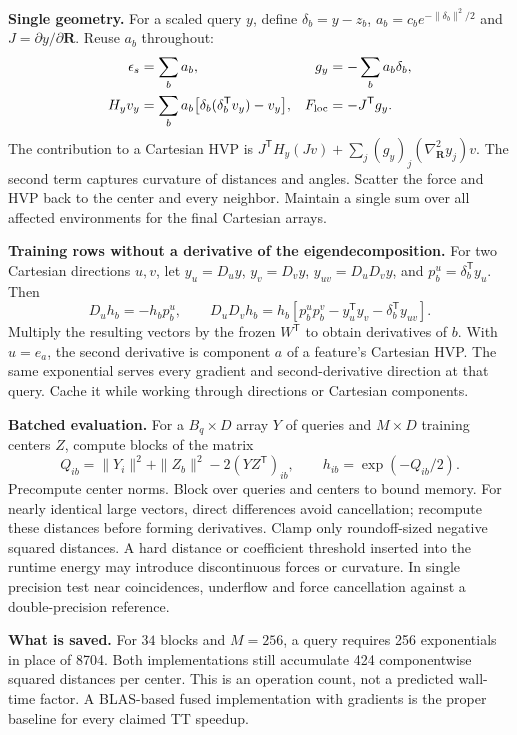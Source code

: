 \documentclass[11pt,a4paper]{article}
\newcommand{\T}{\mathsf T}\newcommand{\tr}{\operatorname{tr}}
\begin{document}
\textbf{Single geometry.} For a scaled query $y$, define $\delta_b=y-z_b$, $a_b=c_b e^{-\|\delta_b\|^2/2}$ and $J=\partial y/\partial\mathbf R$. Reuse $a_b$ throughout:
\begin{align}
 \epsilon_s&=\sum_b a_b,& g_y&=-\sum_b a_b\delta_b,\\
 H_y v_y&=\sum_b a_b\big[\delta_b(\delta_b^\T v_y)-v_y\big],&
 F_{\rm loc}&=-J^\T g_y . \label{eq:fusedh}
\end{align}
The contribution to a Cartesian HVP is $J^\T H_y(Jv)+\sum_j(g_y)_j(\nabla^2_{\mathbf R}y_j)v$. The second term captures curvature of distances and angles. Scatter the force and HVP back to the center and every neighbor. Maintain a single sum over all affected environments for the final Cartesian arrays.

\textbf{Training rows without a derivative of the eigendecomposition.} For two Cartesian directions $u,v$, let $y_u=D_u y$, $y_v=D_v y$, $y_{uv}=D_uD_v y$, and $p_b^u=\delta_b^\T y_u$. Then
\begin{equation}
 D_u h_b=-h_b p_b^u,\qquad
 D_uD_v h_b=h_b[p_b^u p_b^v-y_u^\T y_v-\delta_b^\T y_{uv}]. \label{eq:fusejet}
\end{equation}
Multiply the resulting vectors by the frozen $W^\T$ to obtain derivatives of $b$. With $u=e_a$, the second derivative is component $a$ of a feature's Cartesian HVP. The same exponential serves every gradient and second-derivative direction at that query. Cache it while working through directions or Cartesian components.

\textbf{Batched evaluation.} For a $B_q\times D$ array $Y$ of queries and $M\times D$ training centers $Z$, compute blocks of the matrix
\[
 Q_{ib}=\|Y_i\|^2+\|Z_b\|^2-2(YZ^\T)_{ib},\qquad h_{ib}=\exp(-Q_{ib}/2).
\]
Precompute center norms. Block over queries and centers to bound memory. For nearly identical large vectors, direct differences avoid cancellation; recompute these distances before forming derivatives. Clamp only roundoff-sized negative squared distances. A hard distance or coefficient threshold inserted into the runtime energy may introduce discontinuous forces or curvature. In single precision test near coincidences, underflow and force cancellation against a double-precision reference.

\textbf{What is saved.} For $34$ blocks and $M=256$, a query requires 256 exponentials in place of 8704. Both implementations still accumulate 424 componentwise squared distances per center. This is an operation count, not a predicted wall-time factor. A BLAS-based fused implementation with gradients is the proper baseline for every claimed TT speedup.
\end{document}

